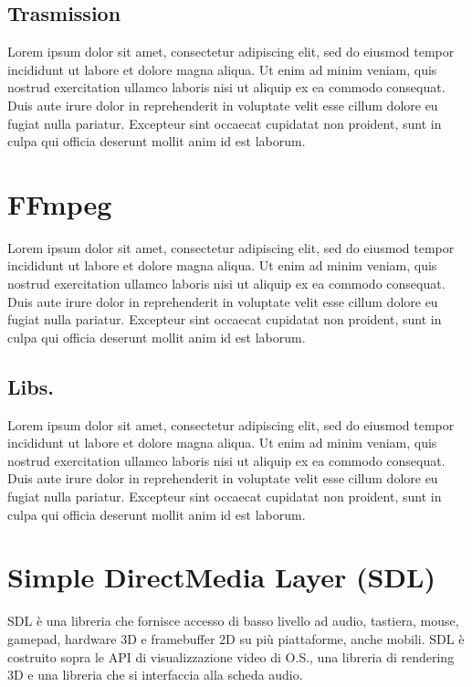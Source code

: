 \subsection{Trasmission}
Lorem ipsum dolor sit amet, consectetur adipiscing elit, sed do eiusmod tempor incididunt ut labore et dolore magna aliqua. Ut enim ad minim veniam, quis nostrud exercitation ullamco laboris nisi ut aliquip ex ea commodo consequat. Duis aute irure dolor in reprehenderit in voluptate velit esse cillum dolore eu fugiat nulla pariatur. Excepteur sint occaecat cupidatat non proident, sunt in culpa qui officia deserunt mollit anim id est laborum.



\section{FFmpeg}
Lorem ipsum dolor sit amet, consectetur adipiscing elit, sed do eiusmod tempor incididunt ut labore et dolore magna aliqua. Ut enim ad minim veniam, quis nostrud exercitation ullamco laboris nisi ut aliquip ex ea commodo consequat. Duis aute irure dolor in reprehenderit in voluptate velit esse cillum dolore eu fugiat nulla pariatur. Excepteur sint occaecat cupidatat non proident, sunt in culpa qui officia deserunt mollit anim id est laborum\cite{FFmpeg_Documentation}.

\subsection{Libs.}
Lorem ipsum dolor sit amet, consectetur adipiscing elit, sed do eiusmod tempor incididunt ut labore et dolore magna aliqua. Ut enim ad minim veniam, quis nostrud exercitation ullamco laboris nisi ut aliquip ex ea commodo consequat. Duis aute irure dolor in reprehenderit in voluptate velit esse cillum dolore eu fugiat nulla pariatur. Excepteur sint occaecat cupidatat non proident, sunt in culpa qui officia deserunt mollit anim id est laborum.



\section{Simple DirectMedia Layer (SDL)}
SDL è una libreria che fornisce accesso di basso livello ad audio, tastiera, mouse, gamepad, hardware 3D e framebuffer 2D su più piattaforme, anche mobili. SDL è costruito sopra le API di visualizzazione video di O.S., una libreria di rendering 3D e una libreria che si interfaccia alla scheda audio\cite{SDL_Wiki}.

